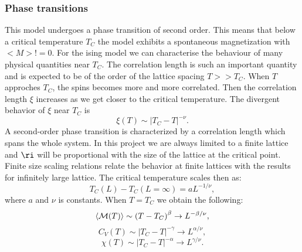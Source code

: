 \documentclass{article}
\begin{document}
\subsubsection*{Phase transitions}
This model undergoes a phase transition of second order. This means that below a critical temperature $T_C$ the model exhibits a spontaneous magnetization with $<M> != 0$. 
For the ising model we can characterise the behaviour of many physical quantities near $T_C$. 
The correlation length is such an important quantity and is expected to be of the order of the lattice spacing $T>>T_C$. When $T$ approches $T_C$, the spins becomes more and more correlated. Then the correlation length $\xi$ increases as we get closer to the critical temperature. The divergent behavior of $\xi$ near $T_C$ is 
\begin{equation}
  \xi(T) \sim \left|T_C-T\right|^{-\nu}.
  \label{eq:xi}
\end{equation}
A second-order phase transition is characterized by a correlation length which spans the whole system. In this project we are always limited to a finite lattice and $\ri$ will be proportional with the size of the lattice at the critical point. Finite size scaling relations relate the behavior at finite lattices with the results for infinitely large lattice. The critical temperature scales then as: 
\begin{equation}
 T_C(L)-T_C(L=\infty) = aL^{-1/\nu},
 \label{eq:tc}
\end{equation}
where $a$ and $\nu$ is constants. When $T = T_C$ we obtain the following: 
\begin{equation*}
  \langle {\cal M}(T) \rangle \sim \left(T-T_C\right)^{\beta}
  \rightarrow L^{-\beta/\nu},
  \label{eq:scale1}
\end{equation*}
\begin{equation*}
  C_V(T) \sim \left|T_C-T\right|^{-\gamma} \rightarrow L^{\alpha/\nu},
  \label{eq:scale2}
\end{equation*}
\begin{equation*}
  \chi(T) \sim \left|T_C-T\right|^{-\alpha} \rightarrow L^{\gamma/\nu}.
  \label{eq:scale3}
\end{equation*}
\end{document}
